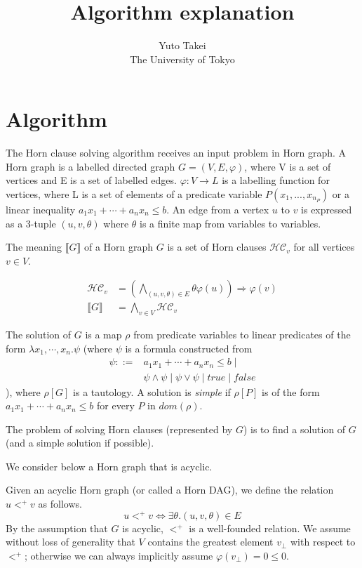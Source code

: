 \documentclass[a4paper,12pt]{article}
\title{Algorithm explanation}
\author{Yuto Takei \\ The University of Tokyo}
\begin{document}
\maketitle

\section{Algorithm}

The Horn clause solving algorithm receives an input problem in Horn
graph. A Horn graph is a labelled directed graph $G=(V,E,\varphi)$,
where V is a set of vertices and E is a set of labelled
edges. $\varphi: V \rightarrow L$ is a labelling function for
vertices, where L is a set of elements of a predicate variable $P(x_1,
..., x_{n_P})$ or a linear inequality $a_1 x_1 + \cdots + a_n x_n \leq
b$.  An edge from a vertex $u$ to $v$ is expressed as a 3-tuple
$(u,v,\theta)$ where $\theta$ is a finite map from variables to
variables.

The meaning $\llbracket G \rrbracket $ of a Horn graph $G$ is a set of
Horn clauses $\mathcal{HC}_v$ for all vertices $v \in V$.

\begin{align*}
\mathcal{HC}_v & = \left( \bigwedge_{(u,v,\theta) \in E} \theta \varphi(u) \right) \Longrightarrow \varphi(v) \\
\llbracket G \rrbracket & = \bigwedge_{v \in V} \mathcal{HC}_v
\end{align*}

The solution of $G$ is a map $\rho$ from predicate variables to linear
predicates of the form $\lambda x_1, \cdots ,x_n. \psi $ (where $\psi$
is a formula constructed from
\begin{align*}
\psi ::= & a_1 x_1 + \cdots + a_n x_n \leq b \mid \\
& \psi \wedge \psi \mid \psi \vee \psi \mid true \mid false
\end{align*}
), where $\rho[G]$ is a tautology. A solution is \textit{simple} if
$\rho[P]$ is of the form $a_1 x_1 + \cdots + a_n x_n \leq b$ for every
$P$ in $dom(\rho)$.

The problem of solving Horn clauses (represented by $G$) is to find a
solution of $G$ (and a simple solution if possible).

We consider below a Horn graph that is acyclic.

Given an acyclic Horn graph (or called a Horn DAG), we define the
relation $u <^+ v$ as follows.
\[ u <^+ v \Longleftrightarrow \exists \theta. (u,v,\theta) \in E \]
By the assumption that $G$ is acyclic, $<^+$ is a well-founded
relation. We assume without loss of generality that $V$ contains the
greatest element $v_\bot$ with respect to $<^+$; otherwise we can
always implicitly assume $\varphi(v_\bot) = 0 \leq 0$.
\end{document}
